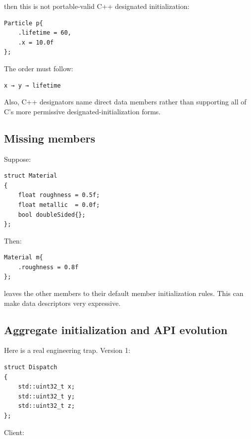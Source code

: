 then this is not portable-valid C++ designated initialization:

\begin{verbatim}
Particle p{
    .lifetime = 60,
    .x = 10.0f
};
\end{verbatim}

The order must follow:

\begin{verbatim}
x → y → lifetime
\end{verbatim}

Also, C++ designators name direct data members rather than supporting all of C's more permissive designated-initialization forms.

\subsection{Missing members}\label{01-foundations-i-ch003-missing-members}

\hypertarget{01-foundations-i-ch003-missing-members}{}

Suppose:

\begin{verbatim}
struct Material
{
    float roughness = 0.5f;
    float metallic  = 0.0f;
    bool doubleSided{};
};
\end{verbatim}

Then:

\begin{verbatim}
Material m{
    .roughness = 0.8f
};
\end{verbatim}

leaves the other members to their default member initialization rules. This can make data descriptors very expressive.

\subsection{Aggregate initialization and API evolution}\label{01-foundations-i-ch003-aggregate-initialization-and-api-evolution}

\hypertarget{01-foundations-i-ch003-aggregate-initialization-and-api-evolution}{}

Here is a real engineering trap. Version 1:

\begin{verbatim}
struct Dispatch
{
    std::uint32_t x;
    std::uint32_t y;
    std::uint32_t z;
};
\end{verbatim}

Client:

